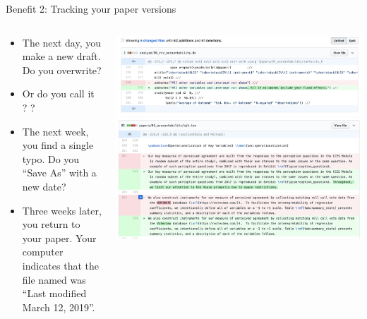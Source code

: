 \documentclass[ignorenonframetext,notes, 10pt, aspectratio=169]{beamer}
\begin{document}
\begin{frame}{Benefit 2: Tracking your paper versions}
\begin{columns}[T]
\begin{column}{0.4\textwidth}
\small
\begin{itemize}
\item The next day, you make a new draft. Do you overwrite?\pause
\item Or do you call it  ? ?\pause
\item The next week, you find a single typo. Do you ``Save As'' with a new date?\pause
\item Three weeks later, you return to your paper.   Your computer indicates that the file named  was ``Last modified March 12, 2019''.
\end{itemize}
\end{column}
\begin{column}{0.6\textwidth}\pause
\includegraphics[width = \linewidth]{writing-diff-1.png}
\includegraphics[width = \linewidth]{writing-diff-2.png}
\end{column}
\end{columns}
\end{frame}
\end{document}
